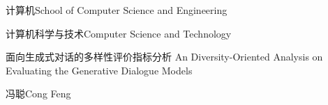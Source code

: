 \school
{计算机}{School of Computer Science and Engineering}

\major
{计算机科学与技术}{Computer Science and Technology}

\thesistitle
{面向生成式对话的多样性评价指标分析}
{}
{An Diversity-Oriented Analysis on Evaluating the Generative Dialogue Models}
{}

\thesisauthor
{冯聪}{Cong Feng}









